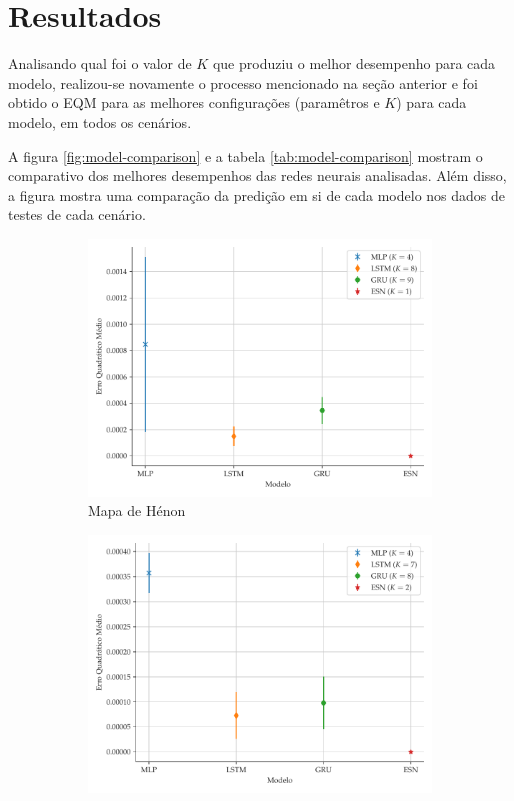 \documentclass{article}
\begin{document}
\section{Resultados}

Analisando qual foi o valor de $K$ que produziu o melhor desempenho para cada modelo, realizou-se novamente o processo mencionado na seção anterior e foi obtido o EQM para as melhores configurações (paramêtros e $K$) para cada modelo, em todos os cenários. 

A figura \ref{fig:model-comparison} e a tabela \ref{tab:model-comparison} mostram o comparativo dos melhores desempenhos das redes neurais analisadas. Além disso, a figura mostra uma comparação da predição em si de cada modelo nos dados de testes de cada cenário.
\begin{figure}[!h]
     \begin{subfigure}[t]{0.2\textwidth}
         \includegraphics[scale=0.2]{comparacao-k-henon.pdf}
         \caption{Mapa de Hénon}
     \end{subfigure}
     \centering
     \begin{subfigure}[t]{0.2\textwidth} 
         \includegraphics[scale=0.2]{comparacao-k-logistic.pdf}

\end{subfigure}
\end{figure}
\end{document}
